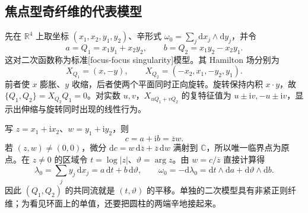 \subsection{焦点型奇纤维的代表模型}
\label{g4:subsec:1103:04}
先在 \(\mathbb R^4\) 上取坐标 \((x_1,x_2,y_1,y_2)\)、辛形式 \(\omega_0=\sum_j\mathrm{d}x_j\wedge\mathrm{d}y_j\)，并令
\begin{equation}\label{g4:eq:1103:focus-quadratic}
	a=Q_1=x_1y_1+x_2y_2,\qquad
	b=Q_2=x_1y_2-x_2y_1.
\end{equation}
这对二次函数称为标准[focus-focus singularity]模型。其 Hamilton 场分别为
\[
	X_{Q_1}=(x,-y),\qquad
	X_{Q_2}=(-x_2,x_1,-y_2,y_1).
\]
前者使 \(x\) 膨胀、\(y\) 收缩，后者使两个平面同时正向旋转。旋转保持内积 \(x\cdot y\)，故 \(\{Q_1,Q_2\}=X_{Q_2}Q_1=0\)。对实数 \(u,v\)，\(X_{uQ_1+vQ_2}\) 的复特征值为 \(u\pm\mathrm{i}v,-u\pm\mathrm{i}v\)，显示出伸缩与旋转同时出现的线性行为。

\ProseParagraphBreak

写 \(z=x_1+\mathrm{i}x_2\)、\(w=y_1+\mathrm{i}y_2\)，则
\[
	c=a+\mathrm{i}b=\overline z w.
\]
若 \((z,w)\ne(0,0)\)，微分 \(\mathrm{d}c=w\,\mathrm{d}\overline z+\overline z\,\mathrm{d}w\) 满射到 \(\mathbb C\)，所以唯一临界点为原点。在 \(z\ne0\) 的区域令 \(t=\log|z|\)、\(\vartheta=\arg z\)。由 \(w=c/\overline z\) 直接计算得
\begin{equation}\label{g4:eq:1103:focus-cylinder}
	\lambda_0=\sum_jy_j\,\mathrm{d}x_j
	=a\,\mathrm{d}t+b\,\mathrm{d}\vartheta,
	\qquad
	\omega_0=-\mathrm{d}\lambda_0
	=\mathrm{d}t\wedge\mathrm{d}a+\mathrm{d}\vartheta\wedge\mathrm{d}b.
\end{equation}
因此 \((Q_1,Q_2)\) 的共同流就是 \((t,\vartheta)\) 的平移。单独的二次模型具有非紧正则纤维；为看见环面上的单值，还要把圆柱的两端辛地接起来。

